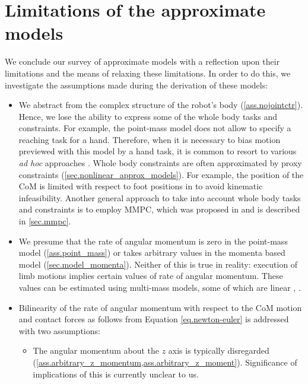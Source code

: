 \section{Limitations of the approximate models}\label{sec.approx_models_limitations}

We conclude our survey of approximate models with a reflection upon their
limitations and the means of relaxing these limitations. In order to do this,
we investigate the assumptions made during the derivation of these models:
%
\begin{itemize}
    \item We abstract from the complex structure of the robot's body
        (\cref{ass.nojointctr}). Hence, we lose the ability to express some of
        the whole body tasks and constraints. For example, the point-mass model
        does not allow to specify a reaching task for a hand. Therefore, when
        it is necessary to bias motion previewed with this model by a hand
        task, it is common to resort to various \emph{ad hoc} approaches
        \cite{Yoshida2006humanoids, Nishiwaki2003icra, Fukumoto2004iros}. Whole
        body constraints are often approximated by proxy constraints
        (\cref{sec.nonlinear_approx_models}). For example, the position of the
        \ac{CoM} is limited with respect to foot positions in
        \cite{Brasseur2015humanoids, Dellin2012icra} to avoid kinematic
        infeasibility. Another general approach to take into account whole body
        tasks and constraints is to employ \ac*{MMPC}, which was proposed in
        \cite{Sherikov2014humanoids} and is described in \cref{sec.mmpc}.


    \item We presume that the rate of angular momentum is zero in the
        point-mass model (\cref{ass.point_mass}) or takes arbitrary values in
        the momenta based model (\cref{sec.model_momenta}). Neither of this is
        true in reality: execution of limb motions implies certain values of
        rate of angular momentum. These values can be estimated using
        multi-mass models, some of which are linear
        \cite[Chapter~3]{Herdt2012thesis}, \cite{Lafaye2014humanoids,
        Shimmyo2013tie, Takenaka2009iros}.


    \item Bilinearity of the rate of angular momentum with respect to the
        \ac{CoM} motion and contact forces as follows from Equation
        \cref{eq.newton-euler} is addressed with two assumptions:
        \begin{itemize}
            \item The angular momentum about the $z$ axis is typically
                disregarded
                (\cref{ass.arbitrary_z_momentum,ass.arbitrary_z_moment}).
                Significance of implications of this is currently unclear to
                us.


\end{itemize}
\end{itemize}
